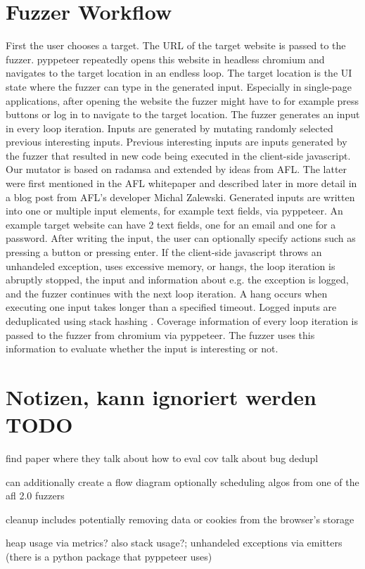 \documentclass[12pt]{article}
\begin{document}
\section{Fuzzer Workflow}

First the user chooses a target. The URL of the target website is passed to the fuzzer. pyppeteer repeatedly opens this website in headless chromium and navigates to the target location in an endless loop. The target location is the UI state where the fuzzer can type in the generated input. Especially in single-page applications, after opening the website the fuzzer might have to for example press buttons or log in to navigate to the target location. The fuzzer generates an input in every loop iteration. Inputs are generated by mutating randomly selected previous interesting inputs. Previous interesting inputs are inputs generated by the fuzzer that resulted in new code being executed in the client-side javascript. Our mutator is based on radamsa \cite{7} and extended by ideas from AFL. The latter were first mentioned in the AFL whitepaper \cite{8} and described later in more detail in a blog post \cite{9} from AFL's developer Michal Zalewski. Generated inputs are written into one or multiple input elements, for example text fields, via pyppeteer. An example target website can have 2 text fields, one for an email and one for a password. After writing the input, the user can optionally specify actions such as pressing a button or pressing enter. If the client-side javascript throws an unhandeled exception, uses excessive memory, or hangs, the loop iteration is abruptly stopped, the input and information about e.g. the exception is logged, and the fuzzer continues with the next loop iteration. A hang occurs when executing one input takes longer than a specified timeout. Logged inputs are deduplicated using stack hashing \cite{10}. Coverage information of every loop iteration is passed to the fuzzer from chromium via pyppeteer. The fuzzer uses this information to evaluate whether the input is interesting or not.

\section{Notizen, kann ignoriert werden TODO}

find paper where they talk about how to eval cov
talk about bug dedupl

can additionally create a flow diagram
optionally scheduling algos from one of the afl 2.0 fuzzers

cleanup includes potentially removing data or cookies from the browser's storage

heap usage via metrics? also stack usage?; unhandeled exceptions via emitters (there is a python package that pyppeteer uses)

	
\printbibliography 
\end{document}
